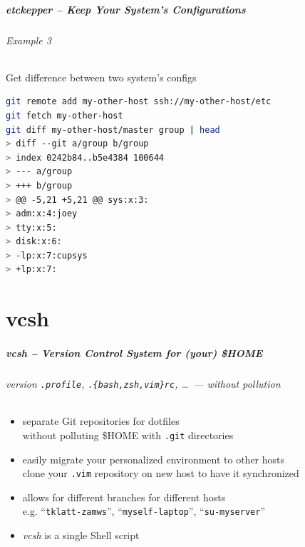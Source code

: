 \documentclass[english,hyperref={pdfpagelabels=false},aspectratio=169]{beamer}
\begin{document}
\begin{frame}[fragile]
  \frametitle{etckepper -- Keep Your System's Configurations}
  \framesubtitle{Example 3}
  \begin{block}{Get difference between two system's configs}
    \vspace{-0.75em}
    \begin{lstlisting}[language=zsh]
git remote add my-other-host ssh://my-other-host/etc
git fetch my-other-host
git diff my-other-host/master group | head
> diff --git a/group b/group
> index 0242b84..b5e4384 100644
> --- a/group
> +++ b/group
> @@ -5,21 +5,21 @@ sys:x:3:
> adm:x:4:joey
> tty:x:5:
> disk:x:6:
> -lp:x:7:cupsys
> +lp:x:7:
    \end{lstlisting}
    \vspace{-0.75em}
  \end{block}
\end{frame}


\part{vcsh}
\makepart

\begin{frame}[label=vcsh]
  \frametitle{vcsh -- Version Control System for (your) \$HOME}
  \framesubtitle{version \texttt{.profile}, \texttt{.\{bash,zsh,vim\}rc}, \dots~--- without pollution}
  \begin{itemize}
    \item separate Git repositories for dotfiles\\
      {\scriptsize without polluting \$HOME with \texttt{.git} directories}
    \item easily migrate your personalized environment to other hosts\\
      {\scriptsize clone your \texttt{.vim} repository on new host to have it synchronized}
    \item allows for different branches for different hosts\\
      {\scriptsize e.g. ``\texttt{tklatt-zamws}'', ``\texttt{myself-laptop}'', ``\texttt{su-myserver}''}
    \item \textit{vcsh} is a single Shell script
  \end{itemize}
\end{frame}
\end{document}
